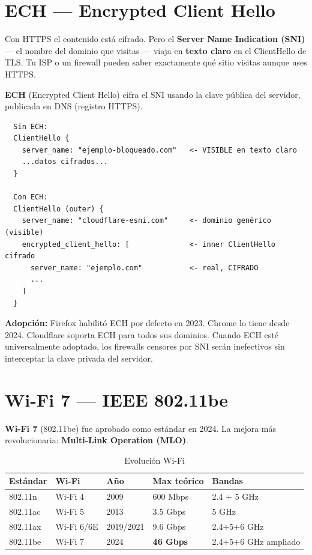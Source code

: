 \section{ ECH --- Encrypted Client Hello}

\begin{concepto}
Con HTTPS el contenido está cifrado. Pero el \textbf{Server Name
Indication (SNI)} --- el nombre del dominio que visitas --- viaja en
\textbf{texto claro} en el ClientHello de TLS. Tu ISP o un firewall
pueden saber exactamente qué sitio visitas aunque uses HTTPS.

\textbf{ECH} (Encrypted Client Hello) cifra el SNI usando la clave
pública del servidor, publicada en DNS (registro HTTPS).
\end{concepto}

\begin{lstlisting}
  Sin ECH:
  ClientHello {
    server_name: "ejemplo-bloqueado.com"   <- VISIBLE en texto claro
    ...datos cifrados...
  }

  Con ECH:
  ClientHello (outer) {
    server_name: "cloudflare-esni.com"     <- dominio genérico (visible)
    encrypted_client_hello: [              <- inner ClientHello cifrado
      server_name: "ejemplo.com"           <- real, CIFRADO
      ...
    ]
  }
\end{lstlisting}

\begin{moderno}
\textbf{ Adopción:} Firefox habilitó ECH por defecto en 2023.
Chrome lo tiene desde 2024. Cloudflare soporta ECH para todos sus dominios.
Cuando ECH esté universalmente adoptado, los firewalls censores por SNI
serán inefectivos sin interceptar la clave privada del servidor.
\end{moderno}

\section{ Wi-Fi 7 --- IEEE 802.11be}

\begin{concepto}
\textbf{Wi-Fi 7} (802.11be) fue aprobado como estándar en 2024. La mejora
más revolucionaria: \textbf{Multi-Link Operation (MLO)}.
\end{concepto}

\begin{table}[h!]
\centering
\renewcommand{\arraystretch}{1.3}
\begin{tabular}{lllll}
\toprule
\textbf{Estándar} & \textbf{Wi-Fi} & \textbf{Año} & \textbf{Max teórico} & \textbf{Bandas} \\
\midrule
802.11n  & Wi-Fi 4   & 2009      & 600 Mbps          & 2.4 + 5 GHz \\
802.11ac & Wi-Fi 5   & 2013      & 3.5 Gbps          & 5 GHz \\
802.11ax & Wi-Fi 6/6E & 2019/2021 & 9.6 Gbps         & 2.4+5+6 GHz \\
802.11be & Wi-Fi 7   & 2024      & \textbf{46 Gbps}  & 2.4+5+6 GHz ampliado \\
\bottomrule
\end{tabular}
\caption{Evolución Wi-Fi}
\end{table}

